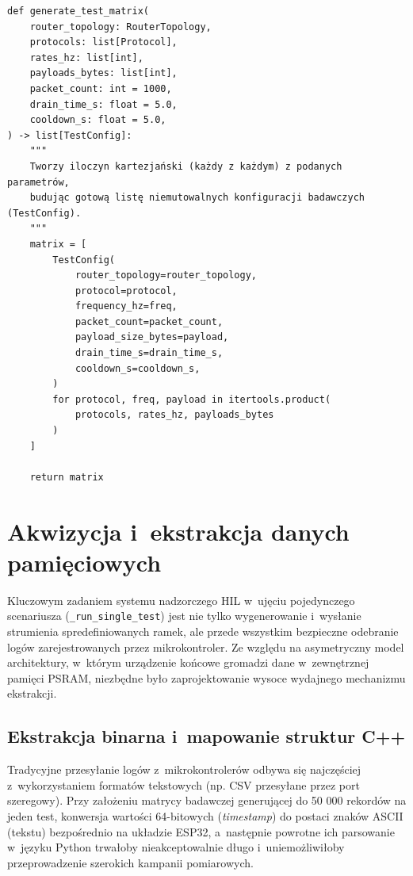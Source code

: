 \begin{listing}[htbp]
    \caption{Wykorzystanie iloczynu kartezjańskiego do generowania bezobsługowej kampanii testowej złożonej z~niemutowalnych konfiguracji (\texttt{matrix.py}) \cite{espy_nexus_python_host}.}
    \label{lst:matrix_cartesian}
    \begin{verbatim}
def generate_test_matrix(
    router_topology: RouterTopology,
    protocols: list[Protocol],
    rates_hz: list[int],
    payloads_bytes: list[int],
    packet_count: int = 1000,
    drain_time_s: float = 5.0,
    cooldown_s: float = 5.0,
) -> list[TestConfig]:
    """
    Tworzy iloczyn kartezjański (każdy z każdym) z podanych parametrów, 
    budując gotową listę niemutowalnych konfiguracji badawczych (TestConfig).
    """
    matrix = [
        TestConfig(
            router_topology=router_topology,
            protocol=protocol,
            frequency_hz=freq,
            packet_count=packet_count,
            payload_size_bytes=payload,
            drain_time_s=drain_time_s,
            cooldown_s=cooldown_s,
        )
        for protocol, freq, payload in itertools.product(
            protocols, rates_hz, payloads_bytes
        )
    ]
    
    return matrix
\end{verbatim}
\end{listing}

\section{Akwizycja i~ekstrakcja danych pamięciowych}
\label{sec:akwizycja_danych_exfiltration}

Kluczowym zadaniem systemu nadzorczego HIL w~ujęciu pojedynczego scenariusza (\texttt{\_run\_single\_test}) jest nie tylko wygenerowanie i~wysłanie strumienia spredefiniowanych ramek, ale przede wszystkim bezpieczne odebranie logów zarejestrowanych przez mikrokontroler.
Ze względu na asymetryczny model architektury, w~którym urządzenie końcowe gromadzi dane w~zewnętrznej pamięci PSRAM, niezbędne było zaprojektowanie wysoce wydajnego mechanizmu ekstrakcji.

\subsection{Ekstrakcja binarna i~mapowanie struktur C++}

Tradycyjne przesyłanie logów z~mikrokontrolerów odbywa się najczęściej z~wykorzystaniem formatów tekstowych (np. CSV przesyłane przez port szeregowy).
Przy założeniu matrycy badawczej generującej do 50 000 rekordów na jeden test, konwersja wartości 64-bitowych (\textit{timestamp}) do postaci znaków ASCII (tekstu) bezpośrednio na układzie ESP32, a~następnie powrotne ich parsowanie w~języku Python trwałoby nieakceptowalnie długo i~uniemożliwiłoby przeprowadzenie szerokich kampanii pomiarowych.

